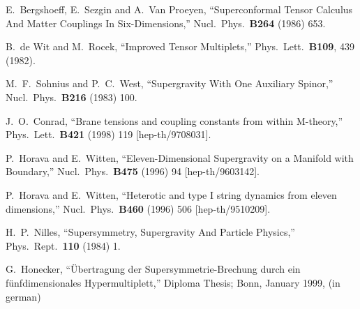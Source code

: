\documentclass[a4paper,12pt, twoside]{article}
\numberwithin{equation}{section}
\begin{document}
\begin{thebibliography}{99}
E.~Bergshoeff, E.~Sezgin and A.~Van Proeyen,
``Superconformal Tensor Calculus And Matter Couplings In 
Six-Dimensions,''
Nucl.\ Phys.\  {\bf B264} (1986) 653.


B.~de Wit and M.~Rocek,
``Improved Tensor Multiplets,''
Phys.\ Lett.\  {\bf B109}, 439 (1982).


M.~F.~Sohnius and P.~C.~West,
``Supergravity With One Auxiliary Spinor,''
Nucl.\ Phys.\  {\bf B216} (1983) 100.


J.~O.~Conrad,
``Brane tensions and coupling constants from within M-theory,''
Phys.\ Lett.\  {\bf B421} (1998) 119
[hep-th/9708031].


P.~Horava and E.~Witten,
``Eleven-Dimensional Supergravity on a Manifold with Boundary,''
Nucl.\ Phys.\  {\bf B475} (1996) 94
[hep-th/9603142].


P.~Horava and E.~Witten,
``Heterotic and type I string dynamics from eleven dimensions,''
Nucl.\ Phys.\  {\bf B460} (1996) 506
[hep-th/9510209].


H.~P.~Nilles,
``Supersymmetry, Supergravity And Particle Physics,''
Phys.\ Rept.\  {\bf 110} (1984) 1.


G.~Honecker,
``\"Ubertragung der Supersymmetrie-Brechung durch ein 
f\"unf\-dimensionales Hypermultiplett,''
Diploma Thesis;
Bonn, January 1999,
(in german)




\end{thebibliography}
\end{document}
